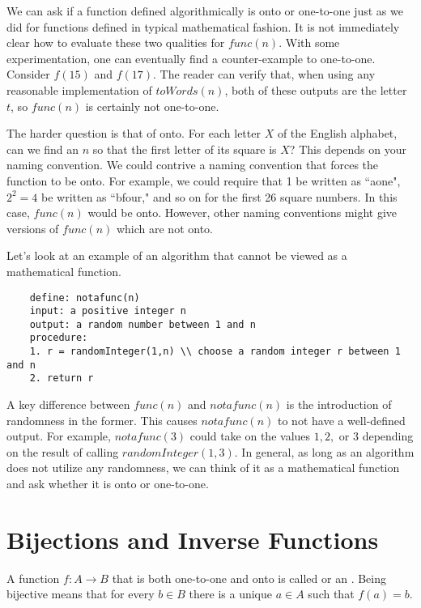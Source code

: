 We can ask if a function defined algorithmically is onto or one-to-one just as we did for
functions defined in typical
mathematical fashion. It is not immediately clear how to evaluate these two
qualities for $func(n)$. With some experimentation, one can eventually find a 
counter-example to one-to-one. Consider $f(15)$ and $f(17)$. The reader
can verify
that, when using any reasonable implementation of $toWords(n)$, both of these outputs are the letter $t$, so $func(n)$ is certainly not one-to-one.

The harder question is that of onto. For each
letter $X$ of the English alphabet, can we find an $n$ so that the first letter of
its square is $X$? This depends on your naming convention. We could contrive a naming convention that forces the function to be
onto. For example, we could require that 1 be written as ``aone", $2^2 = 4$ be written
as ``bfour," and so on for the first 26 square numbers. In this case, $func(n)$ would
be onto. However, other naming conventions might give versions of $func(n)$ which are 
not onto.

Let's look at an example of an algorithm that cannot be viewed as a mathematical
function.

	\begin{verbatim}
	define: notafunc(n)
	input: a positive integer n
	output: a random number between 1 and n
	procedure:
	1. r = randomInteger(1,n) \\ choose a random integer r between 1 and n
	2. return r
	\end{verbatim}

A key difference between $func(n)$ and $notafunc(n)$ is the introduction
of randomness in the former. This causes $notafunc(n)$ to not have a well-defined
output. For example, $notafunc(3)$ could take on the values $1,2,$ or $3$ depending
on the result of calling $randomInteger(1,3)$. In general, as long as an algorithm
does not utilize any randomness, we can think of it as a mathematical function and
ask whether it is onto or one-to-one.

\section{Bijections and Inverse Functions}

A function $f\colon A\to B$ that is both one-to-one and onto is called
 or an . Being bijective means that for every $b\in
B$ there is a unique $a\in A$ such that $f(a)=b$.

